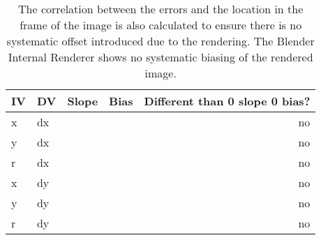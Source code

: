 \begin{table}[htbp]
  \centering
  \caption{The correlation between the errors and the location in the frame of the image is also calculated to ensure there is no systematic offset introduced due to the rendering.  The Blender Internal Renderer shows no systematic biasing of the rendered image.}
    \begin{tabular}{llrrr}
    \toprule
    IV    & DV    & Slope & Bias  & Different than 0 slope 0 bias? \\
    \midrule
    x     & dx    &       &       & no \\
    y     & dx    &       &       & no \\
    r     & dx    &       &       & no \\
    x     & dy    &       &       & no \\
    y     & dy    &       &       & no \\
    r     & dy    &       &       & no \\
    \bottomrule
    \end{tabular}%
  \label{tab:correlations}%
\end{table}%